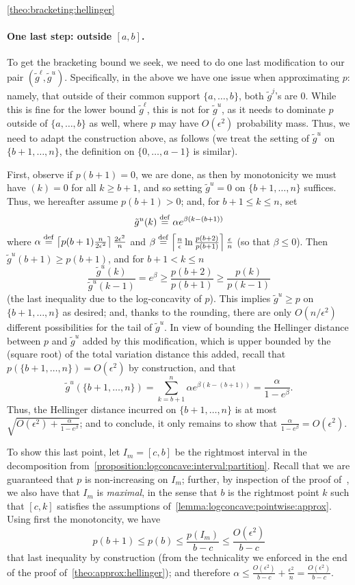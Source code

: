 \documentclass[11pt]{article}
\theoremstyle{definition}
\newcommand{\eps}{\epsilon}
\newcommand{\eqdef}{\stackrel{{\mathrm {\footnotesize def}}}{=}}
\begin{document}
\begin{proofof}{\cref{theo:bracketing:hellinger}}
\paragraph{One last step: outside $[a,b]$.} To get the bracketing bound we seek, we need to do one last modification to our pair $(\tilde{g}^\ell,\tilde{g}^u)$. Specifically, in the above we have one issue when approximating $p$: namely, that outside of their common support $\{a,\dots,b\}$, both $\tilde{g}^j$'s are $0$. While this is fine for the lower bound $\tilde{g}^\ell$, this is not for $\tilde{g}^u$, as it needs to dominate $p$ outside of $\{a,\dots,b\}$ as well, where $p$ may have $O(\eps^2)$  probability mass. Thus, we need to adapt the construction above, as follows (we treat the setting of $\tilde{g}^u$ on $\{b+1,\dots,n\}$, the definition on $\{0,\dots, a-1\}$ is similar).

First, observe if $p(b+1)=0$, we are done, as then by monotonicity we must have $(k)=0$ for all $k\geq b+1$, and so setting $\tilde{g}^u=0$ on $\{b+1,\dots,n\}$ suffices. Thus, we hereafter assume $p(b+1)>0$; and, for $b+1\leq k\leq n$, set
\[
    \tilde{g}^u(k) \eqdef \alpha e^{\beta(k-(b+1))}
\]
where $\alpha \eqdef \clg{p(b+1)\frac{n}{2\eps^2}}\frac{2\eps^2}{n}$ and $\beta \eqdef \clg{\frac{n}{\eps}\ln \frac{p(b+2)}{p(b+1)}}\frac{\eps}{n}$ (so that $\beta \leq 0$). Then $\tilde{g}^u(b+1)\geq p(b+1)$, and for $b+1<k\leq n$
\[
    \frac{\tilde{g}^u(k)}{\tilde{g}^u(k-1)} = e^\beta \geq \frac{p(b+2)}{p(b+1)} \geq \frac{p(k)}{p(k-1)}
\]
(the last inequality due to the log-concavity of $p$). This implies $\tilde{g}^u\geq p$ on $\{b+1,\dots,n\}$ as desired; and, thanks to the rounding, there are only $O(n/\eps^2)$ different possibilities for the tail of $\tilde{g}^u$. 
In view of bounding the Hellinger distance between $p$ and $\tilde{g}^u$ added by this modification, which is upper bounded by the (square root) of the total variation distance this added, recall that $p(\{b+1,\dots,n\})=O(\eps^2)$ by construction, and that
\[
    \tilde{g}^u(\{b+1,\dots,n\}) = \sum_{k=b+1}^n \alpha e^{\beta(k-(b+1))} = \frac{\alpha}{1-e^\beta}.
\]
Thus, the Hellinger distance incurred on $\{b+1,\dots,n\}$ is at most $\sqrt{O(\eps^2)+\frac{\alpha}{1-e^\beta}}$; and to conclude, it only remains to show that $\frac{\alpha}{1-e^\beta} = O(\eps^2)$.

To show this last point, let $I_m=[c,b]$ be the rightmost interval in the decomposition from~\cref{proposition:logconcave:interval:partition}. Recall that we are guaranteed that $p$ is non-increasing on $I_m$; further, by inspection of the proof of~\cite[Proposition 15]{DKS:16:LLCV}, we also have that $I_m$ is \emph{maximal}, in the sense that $b$ is the rightmost point $k$ such that $[c,k]$ satisfies the assumptions of~\cref{lemma:logconcave:pointwise:approx}. Using first the monotoncity, we have
\[
    p(b+1)\leq p(b)\leq \frac{p(I_m)}{b-c} \leq \frac{O(\eps^2)}{b-c}
\]
that last inequality by construction (from the technicality we enforced in the end of the proof of~\cref{theo:approx:hellinger}); and therefore $\alpha \leq \frac{O(\eps^2)}{b-c} + \frac{\eps^2}{n} = \frac{O(\eps^2)}{b-c}$.


\end{proofof}
\end{document}
